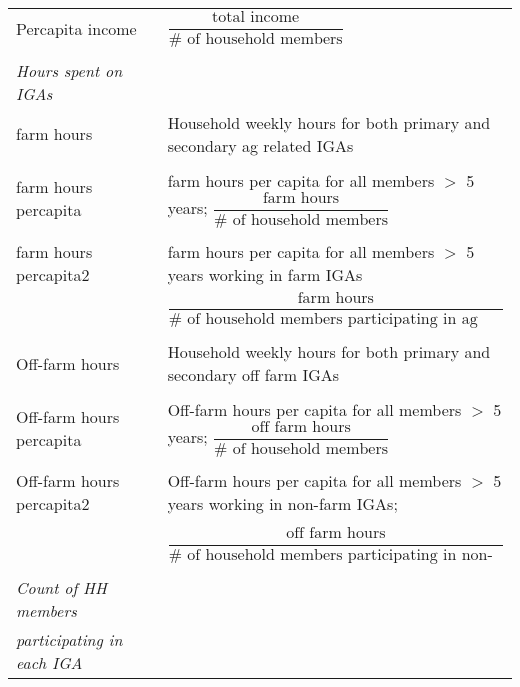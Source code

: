 \documentclass[a4paper,11pt]{article}
\begin{document}
\begin{table}[H]
{\begin{tabular}{ll}
 Percapita income & $\dfrac{\text{total income}}{\text{# of household members}}$  \\
   
      &  \\
      
         
  \textit{Hours spent on IGAs} &   \\
   farm hours &  Household weekly hours for both primary and secondary ag related IGAs  \\
   
         &  \\

     farm hours percapita &  farm hours per capita for all members $>$ 5 years; $\dfrac{\text{farm hours}}{\text{# of household members}}$\\
           &  \\

         
         farm hours percapita2  & farm hours per capita for all members $>$ 5 years working in farm IGAs \\ 
         
             & $\dfrac{\text{farm hours}}{\text{# of household members participating in ag IGA}}$\\
             
                        &  \\


 Off-farm hours &  Household weekly hours for both primary and secondary off farm IGAs  \\
 
         & \\

        Off-farm hours percapita &  Off-farm hours per capita for all members $>$ 5 years; $\dfrac{\text{off farm hours}}{\text{# of household members}}$ \\
         
                 & \\

         Off-farm hours percapita2  & Off-farm hours per capita for all members $>$ 5 years working in non-farm IGAs; \\ 
         & \\
         
            & $\dfrac{\text{off farm hours}}{\text{# of household members participating in non-ag IGA}}$ \\
   &   \\

\textit{Count of HH members} &   \\
  \textit{participating in each IGA} &   \\


\end{tabular}}
\end{table}
\end{document}
